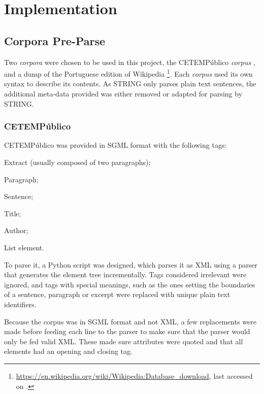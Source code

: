 \chapter{Implementation}
\label{ch:implementation}

\section{Corpora Pre-Parse}

Two \emph{corpora} were chosen to be used in this project, the CETEMPúblico 
\emph{corpus} \citep{rocha2000cetempublico}, and a dump of the Portuguese 
edition of Wikipedia 
\footnote{\url{https://en.wikipedia.org/wiki/Wikipedia:Database_download}, last
accessed on .}. Each \emph{corpus} used its own syntax to
describe its contents. As \ac{STRING} only parses plain text sentences, the
additional meta-data provided was either removed or adapted for parsing by
\ac{STRING}.

\subsection{CETEMPúblico}

CETEMPúblico was provided in \ac{SGML} format with the following tags:

\begin{description}[labelwidth=3em]
 \item [\texttt{ext}] Extract (usually composed of two paragraphs);
 \item [\texttt{p}]   Paragraph;
 \item [\texttt{s}]   Sentence;
 \item [\texttt{t}]   Title;
 \item [\texttt{a}]   Author;
 \item [\texttt{li}]  List element.
\end{description}

To parse it, a Python script was designed, which parses it as \ac{XML} using a
parser that generates the element tree incrementally. Tags considered
irrelevant were ignored, and tags with special meanings, such as the ones
setting the boundaries of a sentence, paragraph or excerpt were replaced with
unique plain text identifiers.

Because the corpus was in \ac{SGML} format and not \ac{XML}, a few replacements
were made before feeding each line to the parser to make sure that the parser 
would only be fed valid \ac{XML}. These made sure attributes were quoted and 
that all elements had an opening and closing tag.

